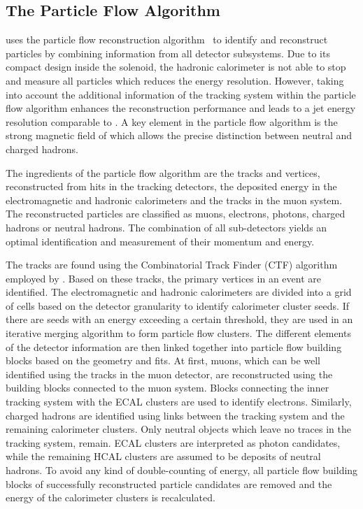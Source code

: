 \subsection{The Particle Flow Algorithm}
\label{sec:particle_flow_algorithm}

\CMS uses the particle flow reconstruction
algorithm~\cite{CMS-PAS-PFT-09-001,CMS-PAS-PFT-10-001} to identify and
reconstruct particles by combining information from all detector
subsystems. Due to its compact design inside the solenoid, the hadronic
calorimeter is not able to stop and measure all particles which reduces the
energy resolution. However, taking into account the additional information of
the tracking system within the particle flow algorithm enhances the
reconstruction performance and leads to a jet energy resolution comparable to
\ATLAS. A key element in the particle flow algorithm is the strong magnetic field
of \CMS which allows the precise distinction between neutral and charged hadrons. 

The ingredients of the particle flow algorithm are the
tracks and vertices, reconstructed from hits in the tracking detectors, the
deposited energy in the electromagnetic and hadronic calorimeters and the tracks
in the muon system. The reconstructed particles are classified as muons,
electrons, photons, charged hadrons or neutral hadrons. The combination of all
sub-detectors yields an optimal identification and measurement of their momentum
and energy.

The tracks are found using the Combinatorial Track Finder (CTF)
algorithm~\cite{Adam:2005cg} employed by \CMS. Based on these tracks, the primary
vertices in an event are identified. The electromagnetic and hadronic
calorimeters are divided into a grid of cells based on the detector granularity
to identify calorimeter cluster seeds. If there are seeds with an energy
exceeding a certain threshold, they are used in an iterative merging algorithm
to form particle flow clusters. The different elements of the detector
information are then linked together into particle flow building blocks based on
the geometry and \chisq fits. At first, muons, which can be well identified
using the tracks in the muon detector, are reconstructed using the building
blocks connected to the muon system. Blocks connecting the inner
tracking system with the ECAL clusters are used to identify electrons.
Similarly, charged hadrons are identified using links between the
tracking system and the remaining calorimeter clusters. Only neutral objects
which leave no traces in the tracking system, remain. ECAL clusters are
interpreted as photon candidates, while the remaining HCAL clusters are assumed
to be deposits of neutral hadrons. To avoid any kind of double-counting of
energy, all particle flow building blocks of successfully reconstructed particle
candidates are removed and the energy of the calorimeter clusters is recalculated.

